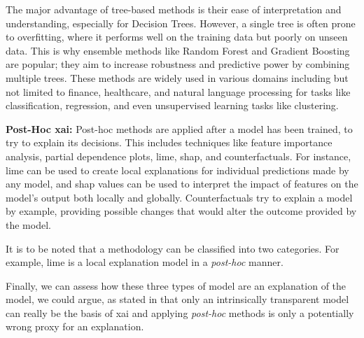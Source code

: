 The major advantage of tree-based methods is their ease of interpretation and understanding, especially for Decision Trees. However, a single tree is often prone to overfitting, where it performs well on the training data but poorly on unseen data. This is why ensemble methods like Random Forest and Gradient Boosting are popular; they aim to increase robustness and predictive power by combining multiple trees. These methods are widely used in various domains including but not limited to finance, healthcare, and natural language processing for tasks like classification, regression, and even unsupervised learning tasks like clustering.

\textbf{Post-Hoc \ac{xai}:} Post-hoc methods are applied after a model has been trained, to try to explain its decisions. This includes techniques like feature importance analysis, partial dependence plots, \ac{lime}, \ac{shap}, and counterfactuals. For instance, \ac{lime} can be used to create local explanations for individual predictions made by any model, and \ac{shap} values can be used to interpret the impact of features on the model's output both locally and globally. Counterfactuals try to explain a model by example, providing possible changes that would alter the outcome provided by the model.

It is to be noted that a methodology can be classified into two categories. For example, \ac{lime} is a local explanation model in a \textit{post-hoc} manner.

Finally, we can assess how these three types of model are an explanation of the model, we could argue, as stated in \cite{rudinStopExplainingBlack2019} that only an intrinsically transparent model can really be the basis of \ac{xai} and applying \textit{post-hoc} methods is only a potentially wrong proxy for an explanation.
